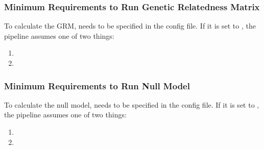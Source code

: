 \documentclass[letterpaper,10pt,english]{sphinxmanual}
\begin{document}
\subsubsection{Minimum Requirements to Run Genetic Relatedness Matrix}
\label{\detokenize{grmParameters:minimum-requirements-to-run-genetic-relatedness-matrix}}\label{\detokenize{grmParameters::doc}}
To calculate the GRM,  needs to be specified in the config file.  If it is set to , the pipeline assumes one of two things:
\begin{enumerate}
%
\item {} 

\item {} 

\end{enumerate}


\subsubsection{Minimum Requirements to Run Null Model}
\label{\detokenize{nullModelParameters:minimum-requirements-to-run-null-model}}\label{\detokenize{nullModelParameters::doc}}
To calculate the null model,  needs to be specified in the config file.  If it is set to , the pipeline assumes one of two things:
\begin{enumerate}
%
\item {} 

\item {} 

\end{enumerate}
\end{document}

